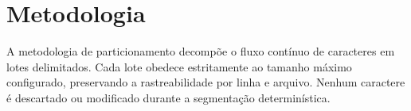 \section{Metodologia}
A metodologia de particionamento decompõe o fluxo contínuo de caracteres em lotes delimitados.
Cada lote obedece estritamente ao tamanho máximo configurado, preservando a rastreabilidade por linha e arquivo.
Nenhum caractere é descartado ou modificado durante a segmentação determinística.
